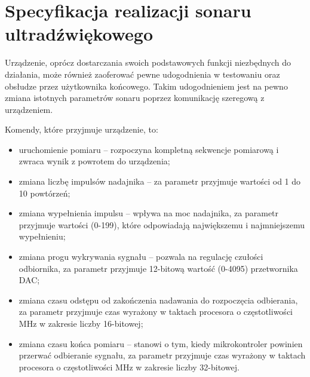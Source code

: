 \chapter[Specyfikacja realizacji sonaru ultradźwiękowego]{Specyfikacja realizacji sonaru ultradźwiękowego}

\label{chapter:specyfikacja}

Urządzenie, oprócz dostarczania swoich podstawowych funkcji niezbędnych do działania, 
może również zaoferować pewne udogodnienia w testowaniu oraz obsłudze przez użytkownika końcowego.
Takim udogodnieniem jest na pewno zmiana istotnych parametrów sonaru poprzez komunikację szeregową z urządzeniem.

Komendy, które przyjmuje urządzenie, to:
\begin{itemize}
    \item uruchomienie pomiaru -- rozpoczyna kompletną sekwencje pomiarową i zwraca wynik z powrotem do urządzenia;
    \item zmiana liczbę impulsów nadajnika -- za parametr przyjmuje wartości od 1 do 10 powtórzeń;
    \item zmiana wypełnienia impulsu -- wpływa na moc nadajnika, za parametr przyjmuje wartości (0-199), które odpowiadają największemu i najmniejszemu wypełnieniu;
    \item zmiana progu wykrywania sygnału  -- pozwala na regulację czułości odbiornika, za parametr przyjmuje 12-bitową wartość (0-4095) przetwornika DAC;
    \item zmiana czasu odstępu od zakończenia nadawania do rozpoczęcia odbierania, 
    za parametr przyjmuje czas wyrażony w taktach procesora o częstotliwości \unit[80]{MHz} w zakresie liczby 16-bitowej;  
    \item zmiana czasu końca pomiaru -- stanowi o tym, kiedy mikrokontroler powinien przerwać odbieranie sygnału, 
    za parametr przyjmuje czas wyrażony w taktach procesora o częstotliwości \unit[80]{MHz} w zakresie liczby 32-bitowej. 
\end{itemize}



